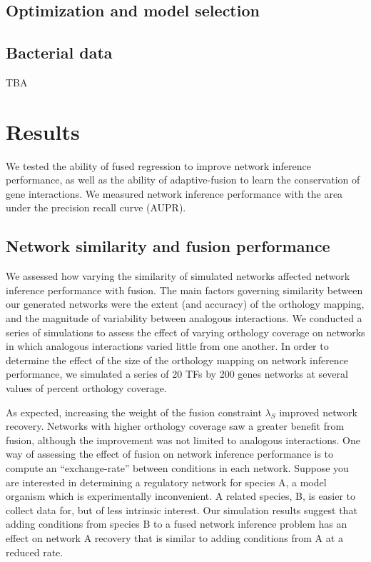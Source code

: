 \documentclass[11pt]{article}
\begin{document}
\subsection{Optimization and model selection}

\subsection{Bacterial data}
TBA

\section{Results}
We tested the ability of fused regression to improve network inference performance, as well as the ability of adaptive-fusion to learn the conservation of gene interactions. We measured network inference performance with the area under the precision recall curve (AUPR). 



\subsection{Network similarity and fusion performance}
We assessed how varying the similarity of simulated networks affected network inference performance with fusion. The main factors governing similarity between our generated networks were the extent (and accuracy) of the orthology mapping, and the magnitude of variability between analogous interactions. We conducted a series of simulations to assess the effect of varying orthology coverage on networks in which analogous interactions varied little from one another. In order to determine the effect of the size of the orthology mapping on network inference performance, we simulated a series of 20 TFs by 200 genes networks at several values of percent orthology coverage. 

As expected, increasing the weight of the fusion constraint $\lambda_S$ improved network recovery. Networks with higher orthology coverage saw a greater benefit from fusion, although the improvement was not limited to analogous interactions. One way of assessing the effect of fusion on network inference performance is to compute an ``exchange-rate'' between conditions in each network. Suppose you are interested in determining a regulatory network for species A, a model organism which is experimentally inconvenient. A related species, B, is easier to collect data for, but of less intrinsic interest. Our simulation results suggest that adding conditions from species B to a fused network inference problem has an effect on network A recovery that is similar to adding conditions from A at a reduced rate. 
\end{document}
